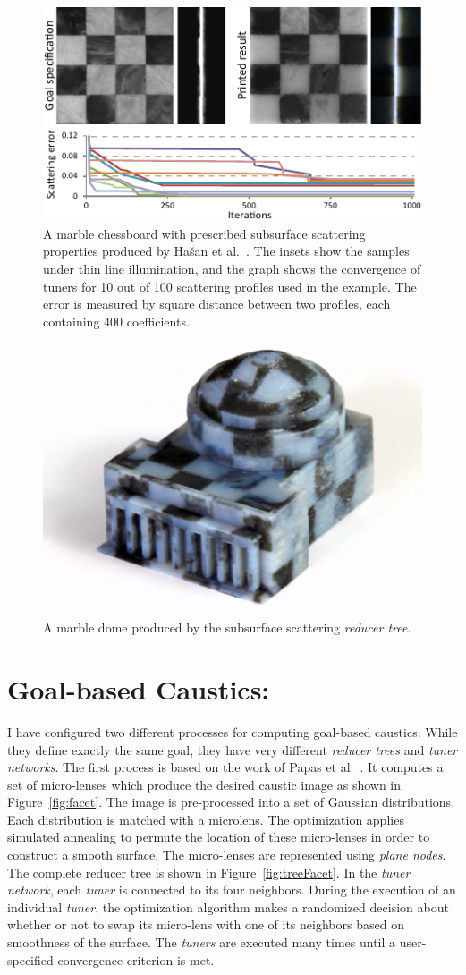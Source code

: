\begin{figure}[h]
\centering
\includegraphics[width=0.65\linewidth]{figure/fig_chess.pdf}
\caption{
	A marble chessboard with prescribed subsurface scattering properties produced by Ha\v{s}an et al.~.
	The insets show the samples under thin line illumination, and the graph shows the convergence of tuners for 10 out of 100 scattering profiles used in the example. The error is measured by square distance between two profiles, each containing 400 coefficients.}
\label{fig:sub}
\end{figure}

\begin{figure}[h]
\centering
\includegraphics[width=0.45\linewidth]{figure/dome.png}
\caption{
	A marble dome produced by the subsurface scattering \emph{reducer tree}.}
\label{fig:dome}
\end{figure}

\section{Goal-based Caustics:}
I have configured two different processes for computing goal-based caustics.
While they define exactly the same goal, they have very different \emph{reducer trees} and \emph{tuner networks}.
The first process is based on the work of Papas et al.~.
It computes a set of micro-lenses which produce the desired caustic image as shown in Figure~\ref{fig:facet}.
The image is pre-processed into a set of Gaussian distributions.
Each distribution is matched with a microlens.
The optimization applies simulated annealing to permute the location of these micro-lenses
in order to construct a smooth surface.
The micro-lenses are represented using \emph{plane nodes}.
The complete reducer tree is shown in Figure~\ref{fig:treeFacet}.
In the \emph{tuner network}, each \emph{tuner} is connected to its four neighbors.
During the execution of an individual \emph{tuner},
the optimization algorithm makes a randomized decision
about whether or not to swap its micro-lens with one of its neighbors based on smoothness of the surface.
The \emph{tuners} are executed many times until a user-specified convergence criterion is met. 

